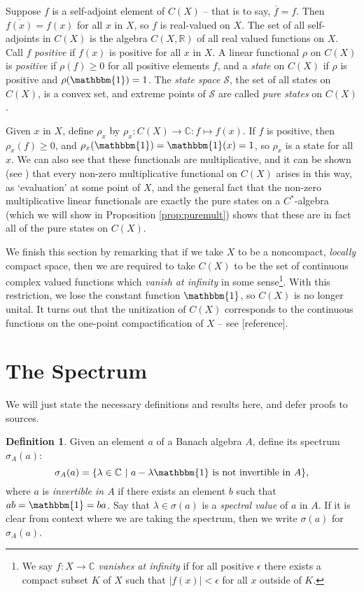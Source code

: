 \documentclass[12pt,a4paper]{report}
\theoremstyle{plain}
\theoremstyle{definition}
\newtheorem{defn}{Definition}
\newcommand{\1}{\mathbbm{1}}
\newcommand{\C}{\mathbb{C}}
\newcommand{\R}{\mathbb{R}}
\newcommand{\CX}{C(X)}
\renewcommand{\S}{\mathscr{S}}
\newcommand{\spec}[1]{\sigma(#1)}
\renewcommand{\bar}{\overline}
\begin{document}
Suppose $f$ is a self-adjoint element of $\CX$ -- that is to say, $\bar f = f$. Then $\bar{f(x)} = f(x)$ 
for all $x$ in $X$, so $f$ is real-valued on $X$. The set of all self-adjoints in $\CX$ is the algebra 
$C(X,\R)$ of all real valued functions on $X$. Call $f$ \emph{positive} if $f(x)$ is positive for all $x
$ in $X$. 
A linear functional $\rho$ on $\CX$ is \emph{positive} if $\rho(f)\geq 0$ for all positive elements $f$, 
and a \emph{state} on $\CX$ if $\rho$ is positive and $\rho(\1)=1$. The \emph{state space} $\S$, the set 
of all states on $\CX$, is a convex set, and extreme points of $\S$ are called \emph{pure states} on 
$\CX$.

Given $x$ in $X$, define $\rho_x$ by $\rho_x:\CX\to\C:f\mapsto f(x)$. If $f$ is positive, then 
$\rho_x(f) \geq 0$, and $\rho_x(\1) = \1(x)=1$, so $\rho_x$ is a state for all $x$. We can also see that 
these functionals are multiplicative, and it can be shown (see \cite[Corollary 3.4.2]{kadison83}) that 
every non-zero multiplicative functional on $\CX$ arises in this way, as `evaluation' at some point of 
$X$, and the general fact that the non-zero multiplicative linear functionals are exactly the pure 
states on a $C^\ast$-algebra (which we will show in Proposition \ref{prop:puremult}) shows that these 
are in fact all of the pure states on $\CX$.

We finish this section by remarking that if we take $X$ to be a noncompact, \emph{locally} compact 
space, then we are required to take $\CX$ to be the set of continuous complex valued functions which 
\emph{vanish at infinity} in some sense\footnote
{We say $f:X\to\C$ \emph{vanishes at infinity} if for all positive $\epsilon$ there exists a compact 
subset $K$ of $X$ such that $|f(x)|<\epsilon$ for all $x$ outside of $K$.}. 
With this restriction, we lose the constant function $\1$, so $\CX$ is no longer unital. 
It turns out that the unitization of $\CX$ corresponds to the continuous functions on the one-point 
compactification of $X$ -- see [reference].



\section{The Spectrum}
We will just state the necessary definitions and results here, and defer proofs to sources.

\begin{defn}
	Given an element $a$ of a Banach algebra $A$, define its spectrum $\sigma_A(a)$:
	\[
		\sigma_A(a)=\{\lambda\in \C ~|~ a-\lambda\1 \mbox{ is not invertible in }A\},
	\]
	where $a$ is \emph{invertible in $A$} if there exists an element $b$ such that $ab=\1=ba$. 
	Say that $\lambda\in\spec a$ is a \emph{spectral value} of $a$ in $A$. If it is clear from context 
	where we are taking the spectrum, then we write $\spec{a}$ for $\sigma_A(a)$. 
\end{defn}
\end{document}
